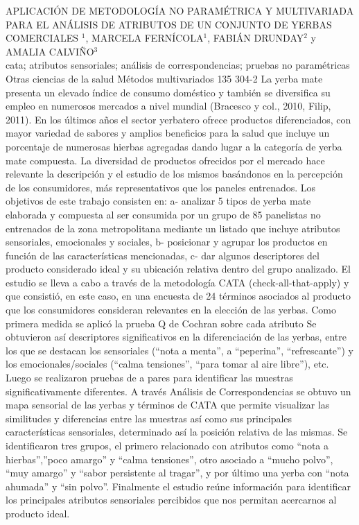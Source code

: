 \A
{APLICACIÓN DE METODOLOGÍA NO PARAMÉTRICA Y MULTIVARIADA PARA EL ANÁLISIS DE ATRIBUTOS DE UN CONJUNTO DE YERBAS COMERCIALES}
{$^1$, MARCELA FERNÍCOLA$^1$, FABIÁN DRUNDAY$^2$ y AMALIA CALVIÑO$^3$}
{
\\}
{cata; atributos sensoriales; análisis de correspondencias; pruebas no paramétricas} 
 {Otras ciencias de la salud} 
 {Métodos multivariados} 
 {135} 
 {304-2}
{La yerba mate presenta un elevado índice de consumo doméstico y también se diversifica su empleo en numerosos mercados a nivel mundial (Bracesco y col., 2010, Filip, 2011). En los últimos años el sector yerbatero ofrece productos diferenciados, con mayor variedad de sabores y amplios beneficios para la salud que incluye un porcentaje de numerosas hierbas agregadas dando lugar a la categoría de yerba mate compuesta. La diversidad de productos ofrecidos por el mercado hace relevante la descripción y el estudio de los mismos basándonos en la percepción de los consumidores, más representativos que los paneles entrenados. Los objetivos de este trabajo consisten en: a- analizar 5 tipos de yerba mate elaborada y compuesta al ser consumida por un grupo de 85 panelistas no entrenados de la zona metropolitana mediante un listado que incluye atributos sensoriales, emocionales y sociales, b- posicionar y agrupar los productos en función de las características mencionadas, c- dar algunos descriptores del producto considerado ideal y su ubicación relativa dentro del grupo analizado. El estudio se lleva a cabo a través de la metodología CATA (check-all-that-apply) y que consistió, en este caso, en una encuesta de 24 términos asociados al producto que los consumidores consideran relevantes en la elección de las yerbas. Como primera medida se aplicó la prueba Q de Cochran sobre cada atributo Se obtuvieron así descriptores significativos en la diferenciación de las yerbas, entre los que se destacan los sensoriales (“nota a menta”, a “peperina”, “refrescante”) y los emocionales/sociales (“calma tensiones”, “para tomar al aire libre”), etc. Luego se realizaron pruebas de a pares para identificar las muestras significativamente diferentes. A través Análisis de Correspondencias se obtuvo un mapa sensorial de las yerbas y términos de CATA que permite visualizar las similitudes y diferencias entre las muestras así como sus principales características sensoriales, determinado así la posición relativa de las mismas. Se identificaron tres grupos, el primero relacionado con atributos como “nota a hierbas”,”poco amargo” y “calma tensiones”, otro asociado a “mucho polvo”, “muy amargo” y “sabor persistente al tragar”, y por último una yerba con “nota ahumada” y “sin polvo”. Finalmente el estudio reúne información para identificar los principales atributos sensoriales percibidos que nos permitan acercarnos al producto ideal. }
